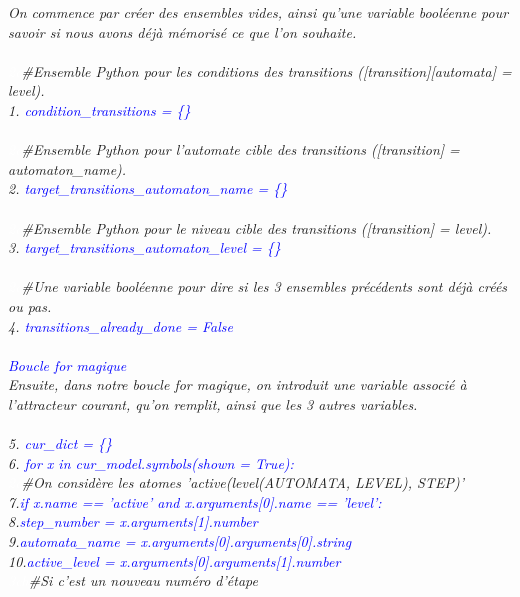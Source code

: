 \documentclass[12pt,a4paper]{article}
\begin{document}
\emph{
	On commence par créer des ensembles vides, ainsi qu'une variable booléenne pour savoir si nous avons déjà mémorisé ce que l'on souhaite.\\ \\
	\textcolor{white}{2c}\#Ensemble Python pour les conditions des transitions ([transition][automata] = level).\\
	1. \textcolor{blue}{condition\_transitions = \{\}}\\ \\
	\textcolor{white}{2c}\#Ensemble Python pour l'automate cible des transitions ([transition] = automaton\_name).\\
	2. \textcolor{blue}{target\_transitions\_automaton\_name = \{\}}\\ \\
	\textcolor{white}{2c}\#Ensemble Python pour le niveau cible des transitions ([transition] = level).\\
	3. \textcolor{blue}{target\_transitions\_automaton\_level = \{\}}\\ \\
	\textcolor{white}{2c}\#Une variable booléenne pour dire si les 3 ensembles précédents sont déjà créés ou pas.\\
	4. \textcolor{blue}{transitions\_already\_done = False}\\ \\
	\textcolor{blue}{Boucle for magique}\\
	Ensuite, dans notre boucle for magique, on introduit une variable associé à l'attracteur courant, qu'on remplit, ainsi que les 3 autres variables.\\ \\
	5. \textcolor{blue}{cur\_dict = \{\}}\\
	6. \textcolor{blue}{for x in cur\_model.symbols(shown = True):}\\
		\textcolor{white}{2c}\qquad\qquad\#On considère les atomes 'active(level(AUTOMATA, LEVEL), STEP)'\\
		7.\qquad\qquad\textcolor{blue}{if x.name == 'active' and x.arguments[0].name == 'level':}\\
			8.\qquad\qquad\qquad\textcolor{blue}{step\_number = x.arguments[1].number}\\
			9.\qquad\qquad\qquad\textcolor{blue}{automata\_name = x.arguments[0].arguments[0].string}\\
			10.\qquad\qquad\qquad\textcolor{blue}{active\_level = x.arguments[0].arguments[1].number}\\
			\textcolor{white}{3ch}\qquad\qquad\qquad\#Si c'est un nouveau numéro d'étape\\
}
\end{document}
